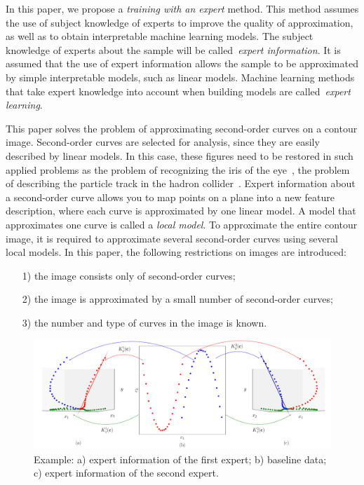 \documentclass[12pt, twoside]{article}
\numberwithin{equation}{section}
\begin{document}
In this paper, we propose a \textit {training with an expert} method.
This method assumes the use of subject knowledge of experts to improve the quality of approximation, as well as to obtain interpretable machine learning models.
The subject knowledge of experts about the sample will be called~\textit {expert information}.
It is assumed that the use of expert information allows the sample to be approximated by simple interpretable models, such as linear models. Machine learning methods that take expert knowledge into account when building models are called~\textit {expert learning}.

This paper solves the problem of approximating second-order curves on a contour image. Second-order curves are selected for analysis, since they are easily described by linear models. In this case, these figures need to be restored in such applied problems as the problem of recognizing the iris of the eye~\cite{Matveev2010, Matveev2014, Bowyer2010}, the problem of describing the particle track in the hadron collider~\cite{Dalila2018}. Expert information about a second-order curve allows you to map points on a plane into a new feature description, where each curve is approximated by one linear model. A model that approximates one curve is called a \textit {local model}. To approximate the entire contour image, it is required to approximate several second-order curves using several local models. In this paper, the following restrictions on images are introduced:
\begin{enumerate}
	\item[1)] the image consists only of second-order curves;
	\item[2)] the image is approximated by a small number of second-order curves;
	\item[3)] the number and type of curves in the image is known.
\end{enumerate}

\begin{figure}[h!]
     \centering
     \includegraphics[width=\textwidth]{figures/explanation}
\caption {Example: a) expert information of the first expert; b) baseline data; c) expert information of the second expert.}
    \label{intro:fig2}
\end{figure}
\end{document}
